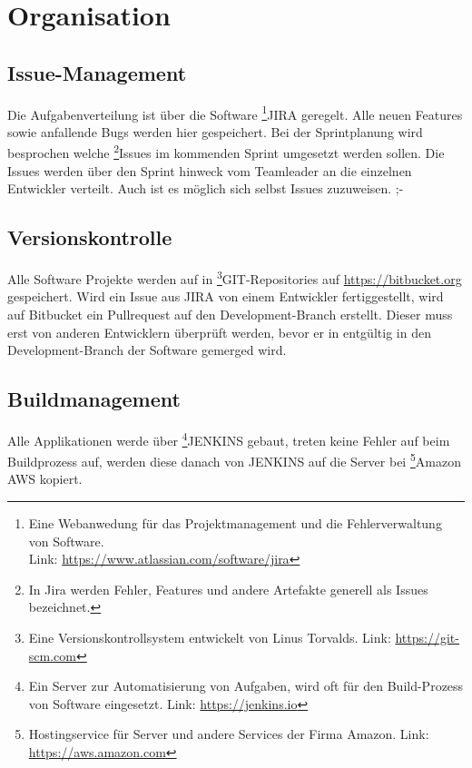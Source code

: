 \documentclass[chapterprefix=false, 12pt, a4paper, oneside, parskip=half, listof=totoc, bibliography=totoc, numbers=noendperiod]{scrbook}
\begin{document}
    \section{Organisation}

    \subsection{Issue-Management}

    Die Aufgabenverteilung ist über die Software \footnote{Eine Webanwedung für das Projektmanagement und die Fehlerverwaltung von Software. \\ Link: \url{https://www.atlassian.com/software/jira}}JIRA geregelt.
    Alle neuen Features sowie anfallende Bugs werden hier gespeichert.
    Bei der Sprintplanung wird besprochen welche \footnote{In Jira werden Fehler, Features und andere Artefakte generell als Issues bezeichnet.}Issues
    im kommenden Sprint umgesetzt werden sollen. Die Issues werden über den Sprint hinweck vom Teamleader an die einzelnen Entwickler verteilt. Auch ist es möglich sich selbst Issues zuzuweisen.
;-
    \pagebreak

    \subsection{Versionskontrolle}

    Alle Software Projekte werden auf in \footnote{Eine Versionskontrollsystem entwickelt von Linus Torvalds. Link: \url{https://git-scm.com}}GIT-Repositories auf \url{https://bitbucket.org} gespeichert. Wird ein Issue aus JIRA von einem
    Entwickler fertiggestellt, wird auf Bitbucket ein Pullrequest auf den Development-Branch erstellt. Dieser muss erst von anderen Entwicklern überprüft werden, bevor er in entgültig in den Development-Branch der Software
    gemerged wird.

    \subsection{Buildmanagement}

    Alle Applikationen werde über \footnote{Ein Server zur Automatisierung von Aufgaben, wird oft für den Build-Prozess von Software eingesetzt. Link: \url{https://jenkins.io}}JENKINS gebaut,
    treten keine Fehler auf beim Buildprozess auf, werden diese danach von JENKINS auf die Server bei \footnote{Hostingservice für Server und andere Services der Firma Amazon. Link: \url{https://aws.amazon.com}}Amazon AWS kopiert.
\end{document}
